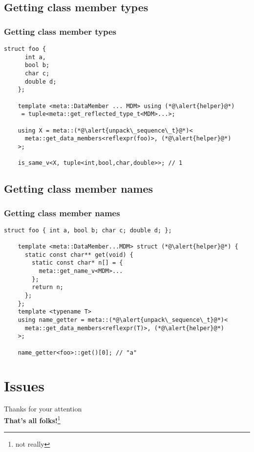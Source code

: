 \documentclass[compress,table,xcolor=table]{beamer}
\begin{document}
\subsection{Getting class member types}
\begin{frame}[fragile]
\frametitle{Getting class member types}
\begin{lstlisting}[basicstyle=\small\ttfamily]
	struct foo {
	  int a,
	  bool b;
	  char c;
	  double d;
	};

	template <meta::DataMember ... MDM> using (*@\alert{helper}@*)
	 = tuple<meta::get_reflected_type_t<MDM>...>;

	using X = meta::(*@\alert{unpack\_sequence\_t}@*)<
	  meta::get_data_members<reflexpr(foo)>, (*@\alert{helper}@*)
	>;

	is_same_v<X, tuple<int,bool,char,double>>; // 1
\end{lstlisting}
\end{frame}

\subsection{Getting class member names}
\begin{frame}[fragile]
\frametitle{Getting class member names}
\begin{lstlisting}[basicstyle=\small\ttfamily]
	struct foo { int a, bool b; char c; double d; };

	template <meta::DataMember...MDM> struct (*@\alert{helper}@*) {
	  static const char** get(void) {
	    static const char* n[] = {
	      meta::get_name_v<MDM>...
	    };
	    return n;
	  };
	};
	template <typename T>
	using name_getter = meta::(*@\alert{unpack\_sequence\_t}@*)<
	  meta::get_data_members<reflexpr(T)>, (*@\alert{helper}@*)
	>;

	name_getter<foo>::get()[0]; // "a"
\end{lstlisting}
\end{frame}

\section{Issues}

\begin{frame}
\begin{center}
\Huge
Thanks for your attention\\
\textbf{That's all folks!}\footnote{not really}
\end{center}
\end{frame}
\end{document}
